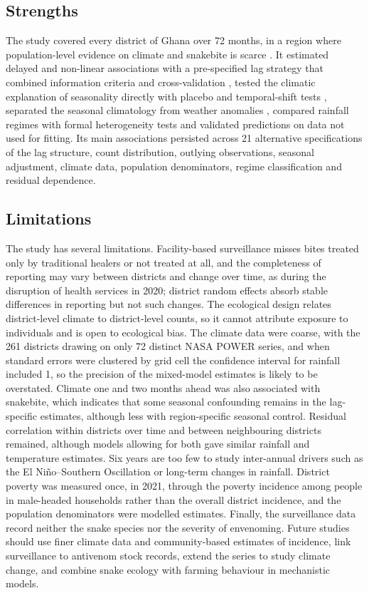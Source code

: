 \documentclass[11pt,a4paper]{article}
\begin{document}
\subsection{Strengths}

The study covered every district of Ghana over 72 months, in a region where population-level evidence on climate and snakebite is scarce \cite{ref8,ref55}. It estimated delayed and non-linear associations with a pre-specified lag strategy that combined information criteria and cross-validation \cite{ref36}, tested the climatic explanation of seasonality directly with placebo and temporal-shift tests \cite{ref39}, separated the seasonal climatology from weather anomalies \cite{ref42}, compared rainfall regimes with formal heterogeneity tests \cite{ref43,ref45} and validated predictions on data not used for fitting. Its main associations persisted across 21 alternative specifications of the lag structure, count distribution, outlying observations, seasonal adjustment, climate data, population denominators, regime classification and residual dependence.

\subsection{Limitations}

The study has several limitations. Facility-based surveillance misses bites treated only by traditional healers or not treated at all, and the completeness of reporting may vary between districts and change over time, as during the disruption of health services in 2020; district random effects absorb stable differences in reporting but not such changes. The ecological design relates district-level climate to district-level counts, so it cannot attribute exposure to individuals and is open to ecological bias. The climate data were coarse, with the 261 districts drawing on only 72 distinct NASA POWER series, and when standard errors were clustered by grid cell the confidence interval for rainfall included 1, so the precision of the mixed-model estimates is likely to be overstated. Climate one and two months ahead was also associated with snakebite, which indicates that some seasonal confounding remains in the lag-specific estimates, although less with region-specific seasonal control. Residual correlation within districts over time and between neighbouring districts remained, although models allowing for both gave similar rainfall and temperature estimates. Six years are too few to study inter-annual drivers such as the El Niño--Southern Oscillation or long-term changes in rainfall. District poverty was measured once, in 2021, through the poverty incidence among people in male-headed households rather than the overall district incidence, and the population denominators were modelled estimates. Finally, the surveillance data record neither the snake species nor the severity of envenoming. Future studies should use finer climate data and community-based estimates of incidence, link surveillance to antivenom stock records, extend the series to study climate change, and combine snake ecology with farming behaviour in mechanistic models.
\end{document}
